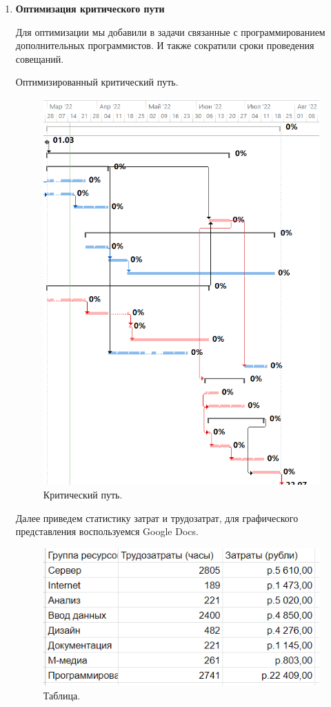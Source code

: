 \documentclass[a4paper,14pt]{extreport} %
\begin{document}
\begin{enumerate}
\item \textbf{Оптимизация критического пути}

Для оптимизации мы добавили в задачи связанные с программированием дополнительных программистов. И также сократили сроки проведения совещаний.

Оптимизированный критический путь.

\begin{figure}[H]
  \centering
  \caption{Критический путь. }
  \includegraphics[scale=0.9]{12}
\end{figure}

Далее приведем статистику затрат и трудозатрат, для графического представления воспользуемся Google Docs.

\begin{figure}[H]
  \centering
  \caption{Таблица. }
  \includegraphics[scale=1]{table}
\end{figure}


\end{enumerate}
\end{document}
